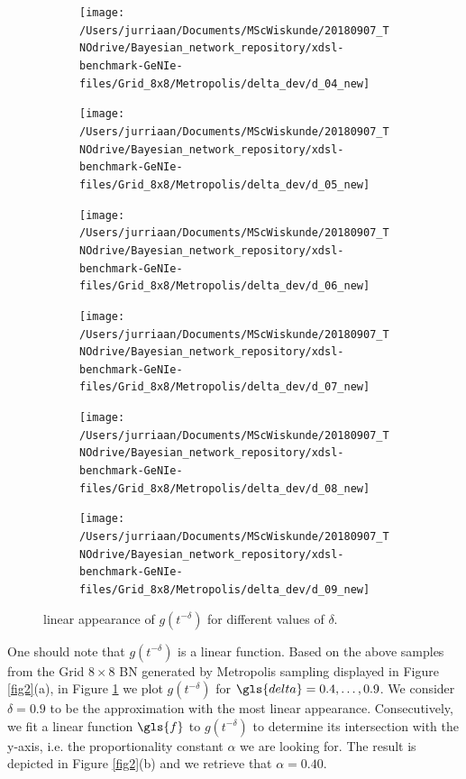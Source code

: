 \documentclass[a4paper, twoside, 11pt]{report}
\theoremstyle{plain}
\theoremstyle{definition}
\theoremstyle{remark}
\begin{document}
\begin{figure}[t!]
\centering
\captionsetup[subfigure]{justification=centering}
\begin{subfigure}{.3\linewidth}
\texttt{[image: /Users/jurriaan/Documents/MScWiskunde/20180907\_TNOdrive/Bayesian\_network\_repository/xdsl-benchmark-GeNIe-files/Grid\_8x8/Metropolis/delta\_dev/d\_04\_new]}
\end{subfigure}\hfill%
\begin{subfigure}{.3\linewidth}
\texttt{[image: /Users/jurriaan/Documents/MScWiskunde/20180907\_TNOdrive/Bayesian\_network\_repository/xdsl-benchmark-GeNIe-files/Grid\_8x8/Metropolis/delta\_dev/d\_05\_new]}
\end{subfigure}\hfill%
\begin{subfigure}{.3\linewidth}
\texttt{[image: /Users/jurriaan/Documents/MScWiskunde/20180907\_TNOdrive/Bayesian\_network\_repository/xdsl-benchmark-GeNIe-files/Grid\_8x8/Metropolis/delta\_dev/d\_06\_new]}
\end{subfigure}\hfill%
\begin{subfigure}{.3\linewidth}
\texttt{[image: /Users/jurriaan/Documents/MScWiskunde/20180907\_TNOdrive/Bayesian\_network\_repository/xdsl-benchmark-GeNIe-files/Grid\_8x8/Metropolis/delta\_dev/d\_07\_new]}
\end{subfigure}\hfill%
\begin{subfigure}{.3\linewidth}
\texttt{[image: /Users/jurriaan/Documents/MScWiskunde/20180907\_TNOdrive/Bayesian\_network\_repository/xdsl-benchmark-GeNIe-files/Grid\_8x8/Metropolis/delta\_dev/d\_08\_new]}
\end{subfigure}\hfill%
\begin{subfigure}{.3\linewidth}
\texttt{[image: /Users/jurriaan/Documents/MScWiskunde/20180907\_TNOdrive/Bayesian\_network\_repository/xdsl-benchmark-GeNIe-files/Grid\_8x8/Metropolis/delta\_dev/d\_09\_new]}
\end{subfigure}\hfill%
\vspace{0.75pc}
\caption{linear appearance of $g(t^{-\delta})$ for different values of $\delta$.}
\label{fig3}
\end{figure}
One should note that $g(t^{-\delta})$ is a linear function. Based on the above samples from the Grid $8 \times 8$ BN generated by Metropolis sampling displayed in Figure \ref{fig2}(a), in Figure \ref{fig3} we plot $g(t^{-\delta})$ for $\gls{delta} = 0.4, \ldots, 0.9$. We consider $\delta = 0.9$ to be the approximation with the most linear appearance. Consecutively, we fit a linear function $\gls{f}$ to $g(t^{-\delta})$ to determine its intersection with the y-axis, i.e. the proportionality constant $\alpha$ we are looking for. The result is depicted in Figure \ref{fig2}(b) and we retrieve that $\alpha = 0.40$. \\
\end{document}
